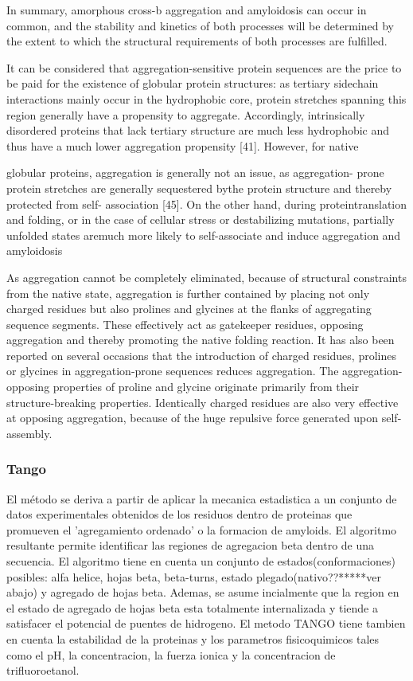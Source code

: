 In summary, amorphous cross-b aggregation and amyloidosis can occur in common, and the stability and kinetics of both processes will be determined by the extent to which the structural requirements of both processes are fulfilled.


It can be considered that aggregation-sensitive protein sequences are the price to be paid for the existence of globular protein structures: as tertiary sidechain interactions mainly occur in the hydrophobic core, protein stretches spanning this region generally have a propensity to aggregate. Accordingly, intrinsically disordered proteins that lack tertiary structure are much less hydrophobic and thus have a much lower aggregation propensity [41]. However, for native 

globular proteins, aggregation is generally not an issue, as aggregation- prone protein stretches are generally sequestered bythe protein structure and thereby protected from self-
association [45]. On the other hand, during proteintranslation and folding, or in the case of cellular stress or destabilizing mutations, partially unfolded states aremuch more likely to self-associate and induce aggregation and amyloidosis



As aggregation cannot be completely eliminated, because of structural constraints from the native state, aggregation is further contained by placing not only charged residues but also prolines and glycines at the flanks of aggregating sequence segments. These effectively act as gatekeeper residues, opposing aggregation and thereby promoting the native folding reaction. It has also been reported on several occasions that the introduction of charged residues, prolines or glycines in aggregation-prone sequences reduces aggregation.
The aggregation-opposing properties of proline and glycine originate primarily from their
structure-breaking properties. Identically charged residues are also very effective at opposing aggregation, because of the huge repulsive force generated upon self-assembly.




\subsubsection{Tango}

El método se deriva a partir de aplicar la mecanica estadistica a un conjunto de datos experimentales obtenidos de los residuos dentro de proteinas que promueven el 'agregamiento ordenado' o la formacion de amyloids. El algoritmo resultante permite identificar las regiones de agregacion beta dentro de una secuencia.
El algoritmo tiene en cuenta un conjunto de estados(conformaciones) posibles: alfa helice, hojas beta, beta-turns, estado plegado(nativo??*****ver abajo) y agregado de hojas beta. Ademas, se asume incialmente que la region en el estado de agregado de hojas beta esta totalmente internalizada y tiende a satisfacer el potencial de puentes de hidrogeno. 
El metodo TANGO tiene tambien en cuenta la estabilidad de la proteinas y los parametros fisicoquimicos tales como el pH, la concentracion, la fuerza ionica y la concentracion de trifluoroetanol.


